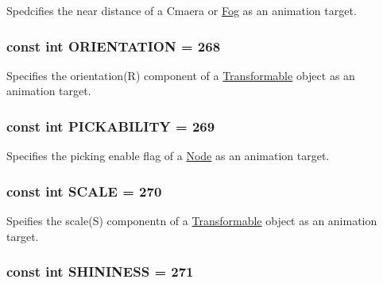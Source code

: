 Spedcifies the near distance of a Cmaera or \hyperlink{classm3g_1_1Fog}{Fog} as an animation target. \hypertarget{classm3g_1_1AnimationTrack_c7fe423a6a639520b0b3d1c1e663784b}{
\subsubsection[{ORIENTATION}]{\setlength{\rightskip}{0pt plus 5cm}const int {\bf ORIENTATION} = 268}}
\label{classm3g_1_1AnimationTrack_c7fe423a6a639520b0b3d1c1e663784b}


Specifies the orientation(R) component of a \hyperlink{classm3g_1_1Transformable}{Transformable} object as an animation target. \hypertarget{classm3g_1_1AnimationTrack_87fcd8136941a05a8a95c61e499692e0}{
\subsubsection[{PICKABILITY}]{\setlength{\rightskip}{0pt plus 5cm}const int {\bf PICKABILITY} = 269}}
\label{classm3g_1_1AnimationTrack_87fcd8136941a05a8a95c61e499692e0}


Specifies the picking enable flag of a \hyperlink{classm3g_1_1Node}{Node} as an animation target. \hypertarget{classm3g_1_1AnimationTrack_8334f0c0c56b96debb10231b86050ead}{
\subsubsection[{SCALE}]{\setlength{\rightskip}{0pt plus 5cm}const int {\bf SCALE} = 270}}
\label{classm3g_1_1AnimationTrack_8334f0c0c56b96debb10231b86050ead}


Speifies the scale(S) componentn of a \hyperlink{classm3g_1_1Transformable}{Transformable} object as an animation target. \hypertarget{classm3g_1_1AnimationTrack_f0b58ddb4173a8d2f5a730dab30e6c6f}{
\subsubsection[{SHININESS}]{\setlength{\rightskip}{0pt plus 5cm}const int {\bf SHININESS} = 271}}
\label{classm3g_1_1AnimationTrack_f0b58ddb4173a8d2f5a730dab30e6c6f}


